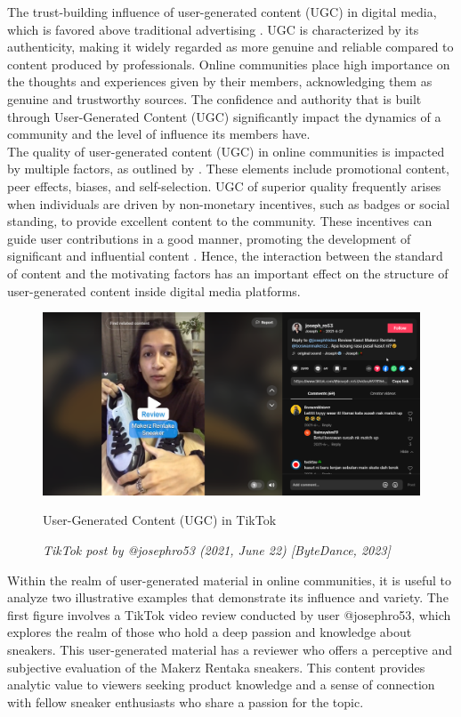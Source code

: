 The trust-building influence of user-generated content (UGC) in digital media, which is favored above traditional advertising \parencite{v22}. UGC is characterized by its authenticity, making it widely regarded as more genuine and reliable compared to content produced by professionals. Online communities place high importance on the thoughts and experiences given by their members, acknowledging them as genuine and trustworthy sources. The confidence and authority that is built through User-Generated Content (UGC) significantly impact the dynamics of a community and the level of influence its members have. \\

The quality of user-generated content (UGC) in online communities is impacted by multiple factors, as outlined by \textcite{luca21}. These elements include promotional content, peer effects, biases, and self-selection. UGC of superior quality frequently arises when individuals are driven by non-monetary incentives, such as badges or social standing, to provide excellent content to the community. These incentives can guide user contributions in a good manner, promoting the development of significant and influential content \parencite{luca21}. Hence, the interaction between the standard of content and the motivating factors has an important effect on the structure of user-generated content inside digital media platforms.\\

\begin{figure}[h]
    \centering
    \includegraphics[width=0.9\linewidth]{mainmatter/images/ugc1.png}
    \caption{User-Generated Content (UGC) in TikTok}
    \caption*{\textit{TikTok post by @josephro53 (2021, June 22) [ByteDance, 2023]}}
    \label{fig:myfig3}
\end{figure}
Within the realm of user-generated material in online communities, it is useful to analyze two illustrative examples that demonstrate its influence and variety. The first figure involves a TikTok video review conducted by user @josephro53, which explores the realm of those who hold a deep passion and knowledge about sneakers. This user-generated material has a reviewer who offers a perceptive and subjective evaluation of the Makerz Rentaka sneakers. This content provides analytic value to viewers seeking product knowledge and a sense of connection with fellow sneaker enthusiasts who share a passion for the topic. \\

